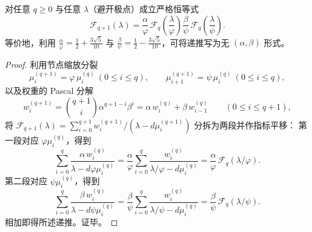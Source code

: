 

\begin{proposition}[割线函数的二尺度自相似递推]\label{prop:conclusion-disjointness-secant-selfsimilar-recurrence}
对任意 \(q\ge 0\) 与任意 \(\lambda\)（避开极点）成立严格恒等式
\[
\mathcal F_{q+1}(\lambda)
=\frac{\alpha}{\varphi}\,\mathcal F_q\!\left(\frac{\lambda}{\varphi}\right)
\frac{\beta}{\psi}\,\mathcal F_q\!\left(\frac{\lambda}{\psi}\right).
\]
等价地，利用
\(
\frac{\alpha}{\varphi}=\frac12+\frac{3\sqrt5}{10}
\)
与
\(
\frac{\beta}{\psi}=\frac12-\frac{3\sqrt5}{10}
\)，可将递推写为无 \((\alpha,\beta)\) 形式。
\end{proposition}
\begin{proof}
利用节点缩放分裂
\[
\mu_i^{(q+1)}=\varphi\,\mu_i^{(q)}\ (0\le i\le q),
\qquad
\mu_{i+1}^{(q+1)}=\psi\,\mu_i^{(q)}\ (0\le i\le q),
\]
以及权重的 Pascal 分解
\[
w_i^{(q+1)}
=\binom{q+1}{i}\alpha^{q+1-i}\beta^i
=\alpha\,w_i^{(q)}+\beta\,w_{i-1}^{(q)}
\qquad(0\le i\le q+1),
\]
将 \(\mathcal F_{q+1}(\lambda)=\sum_{i=0}^{q+1}w_i^{(q+1)}/(\lambda-d\mu_i^{(q+1)})\) 分拆为两段并作指标平移：
第一段对应 \(\varphi\mu_i^{(q)}\)，得到
\[
\sum_{i=0}^{q}\frac{\alpha\,w_i^{(q)}}{\lambda-d\varphi\mu_i^{(q)}}
=\frac{\alpha}{\varphi}\sum_{i=0}^{q}\frac{w_i^{(q)}}{\lambda/\varphi-d\mu_i^{(q)}}
=\frac{\alpha}{\varphi}\,\mathcal F_q(\lambda/\varphi).
\]
第二段对应 \(\psi\mu_i^{(q)}\)，得到
\[
\sum_{i=0}^{q}\frac{\beta\,w_i^{(q)}}{\lambda-d\psi\mu_i^{(q)}}
=\frac{\beta}{\psi}\sum_{i=0}^{q}\frac{w_i^{(q)}}{\lambda/\psi-d\mu_i^{(q)}}
=\frac{\beta}{\psi}\,\mathcal F_q(\lambda/\psi).
\]
相加即得所述递推。证毕。
\end{proof}

